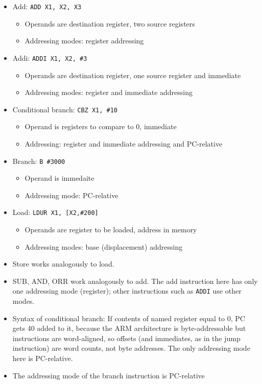 \begin{frame}[fragile]
\begin{itemize}

\item Add: {\tt ADD X1, X2, X3}
\begin{itemize}
\item Operands are destination register, two source registers
\item Addressing modes: register addressing
\end{itemize}
\item Addi: {\tt ADDI X1, X2, \#3}
\begin{itemize}
\item Operands are destination register, one source register and immediate
\item Addressing modes: register and immediate addressing
\end{itemize}
\item Conditional branch: {\tt CBZ X1, \#10}
\begin{itemize}
\item Operand is registers to compare to 0, immediate
\item Addressing: register and immediate addressing and PC-relative
\end{itemize}
\item Branch: {\tt B \#3000}
\begin{itemize}
\item Operand is immedaite 
\item Addressing mode: PC-relative
\end{itemize}
\item Load: {\tt LDUR X1, [X2,\#200]}
\begin{itemize}
\item Operands are register to be loaded, address in memory
\item Addressing modes: base (displacement) addressing
\end{itemize}
\end{itemize}
\BNotes\ifnum{}
\begin{itemize}
\item Store works analogously to load.

\item SUB, AND, ORR work analogously to add. The add instruction
here has only one addressing mode (register); other instructions such
as {\tt ADDI} use other modes.

\item Syntax of conditional branch: If contents of named register equal to 0,
PC gets 40 added to it,
because the ARM architecture is byte-addressable but instructions are
word-aligned, so offsets (and immediates, as in the jump instruction)
are word counts, not byte addresses. The only addressing mode here is
PC-relative. 

\item The addressing mode of the branch instruction is PC-relative
\end{itemize}
\fi\ENotes
\end{frame}

